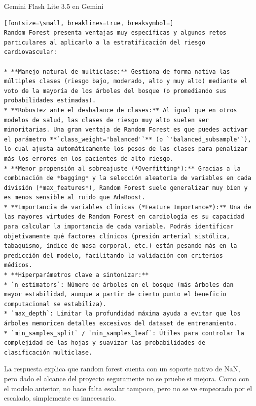 \documentclass[12pt,a4paper,oneside]{book}
\begin{document}
\begin{iaresp}{Gemini Flash Lite 3.5 en Gemini}
\begin{Verbatim}[fontsize=\small, breaklines=true, breaksymbol=]
Random Forest presenta ventajas muy específicas y algunos retos particulares al aplicarlo a la estratificación del riesgo cardiovascular:

* **Manejo natural de multiclase:** Gestiona de forma nativa las múltiples clases (riesgo bajo, moderado, alto y muy alto) mediante el voto de la mayoría de los árboles del bosque (o promediando sus probabilidades estimadas).
* **Robustez ante el desbalance de clases:** Al igual que en otros modelos de salud, las clases de riesgo muy alto suelen ser minoritarias. Una gran ventaja de Random Forest es que puedes activar el parámetro **`class_weight='balanced'`** (o `'balanced_subsample'`), lo cual ajusta automáticamente los pesos de las clases para penalizar más los errores en los pacientes de alto riesgo.
* **Menor propensión al sobreajuste (*Overfitting*):** Gracias a la combinación de *bagging* y la selección aleatoria de variables en cada división (*max_features*), Random Forest suele generalizar muy bien y es menos sensible al ruido que AdaBoost.
* **Importancia de variables clínicas (*Feature Importance*):** Una de las mayores virtudes de Random Forest en cardiología es su capacidad para calcular la importancia de cada variable. Podrás identificar objetivamente qué factores clínicos (presión arterial sistólica, tabaquismo, índice de masa corporal, etc.) están pesando más en la predicción del modelo, facilitando la validación con criterios médicos.
* **Hiperparámetros clave a sintonizar:**
* `n_estimators`: Número de árboles en el bosque (más árboles dan mayor estabilidad, aunque a partir de cierto punto el beneficio computacional se estabiliza).
* `max_depth`: Limitar la profundidad máxima ayuda a evitar que los árboles memoricen detalles excesivos del dataset de entrenamiento.
* `min_samples_split` / `min_samples_leaf`: Útiles para controlar la complejidad de las hojas y suavizar las probabilidades de clasificación multiclase.
\end{Verbatim}
\end{iaresp}
\begin{iaanalisis}
La respuesta explica que random forest cuenta con un soporte nativo de NaN, pero dado el alcance del proyecto seguramente no se pruebe si mejora. Como con el modelo anterior, no hace falta escalar tampoco, pero no se ve empeorado por el escalado, simplemente es innecesario.
\end{iaanalisis}
\end{document}
